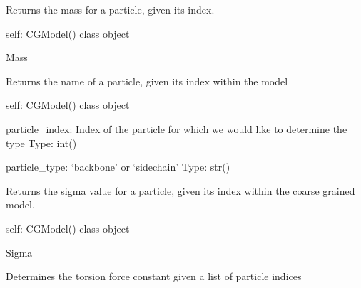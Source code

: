 \documentclass[letterpaper,12pt,english,openany,oneside]{sphinxmanual}
\begin{document}
\begin{fulllineitems}
\begin{fulllineitems}
\label{\detokenize{cg_model:cg_model.cgmodel.CGModel.get_particle_mass}}
Returns the mass for a particle, given its index.

self: CGModel() class object

Mass

\end{fulllineitems}


\begin{fulllineitems}
\label{\detokenize{cg_model:cg_model.cgmodel.CGModel.get_particle_type}}
Returns the name of a particle, given its index within the model

self: CGModel() class object

particle\_index: Index of the particle for which we would like to determine the type
Type: int()

particle\_type: ‘backbone’ or ‘sidechain’
Type: str()

\end{fulllineitems}


\begin{fulllineitems}
\label{\detokenize{cg_model:cg_model.cgmodel.CGModel.get_sigma}}
Returns the sigma value for a particle, given its index within the coarse grained model.

self: CGModel() class object

Sigma

\end{fulllineitems}


\begin{fulllineitems}
\label{\detokenize{cg_model:cg_model.cgmodel.CGModel.get_torsion_force_constant}}
Determines the torsion force constant given a list of particle indices


\end{fulllineitems}
\end{fulllineitems}
\end{document}
